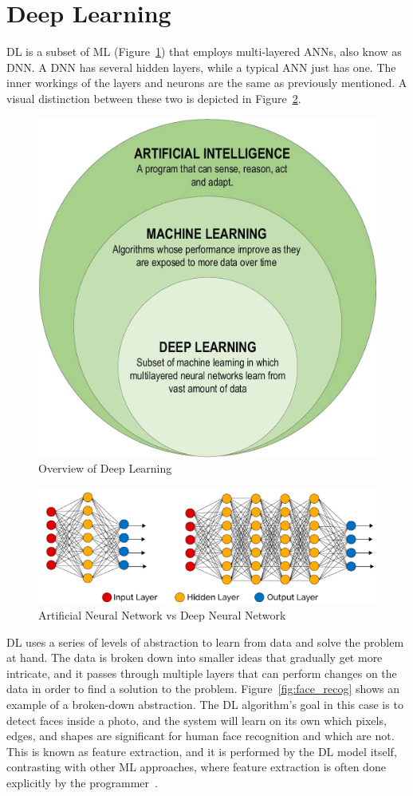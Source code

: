 \section{Deep Learning}

\gls{DL} is a subset of \gls{ML} (Figure~\ref{fig:DL}) that employs multi-layered \gls{ANN}s, also know as \gls{DNN}. A \gls{DNN} has several hidden layers, while a typical \gls{ANN} just has one. The inner workings of the layers and neurons are the same as previously mentioned. A visual distinction between these two is depicted in Figure~\ref{fig:ann-vs-dnn}.

\begin{figure}[htbp]
    \centering
    \includegraphics[width=0.5\linewidth]{Chapters/Figures/DL.png}
    \caption{Overview of Deep Learning~\cite{Alzubaidi2021ReviewDirections}}
    \label{fig:DL}
\end{figure}

\begin{figure}[htbp]
    \centering
    \includegraphics[width=0.8\linewidth]{Chapters/Figures/ann-vs-dnn.png}
    \caption{Artificial Neural Network vs Deep Neural Network~\cite{Mostafa2020MachineArticle}}
    \label{fig:ann-vs-dnn}
\end{figure}

\gls{DL} uses a series of levels of abstraction to learn from data and solve the problem at hand. The data is broken down into smaller ideas that gradually get more intricate, and it passes through multiple layers that can perform changes on the data in order to find a solution to the problem. Figure~\ref{fig:face_recog} shows an example of a broken-down abstraction. The \gls{DL} algorithm's goal in this case is to detect faces inside a photo, and the system will learn on its own which pixels, edges, and shapes are significant for human face recognition and which are not. This is known as feature extraction, and it is performed by the \gls{DL} model itself, contrasting with other \gls{ML} approaches, where feature extraction is often done explicitly by the programmer~\cite{DeClercq2018DeepSequences}.

